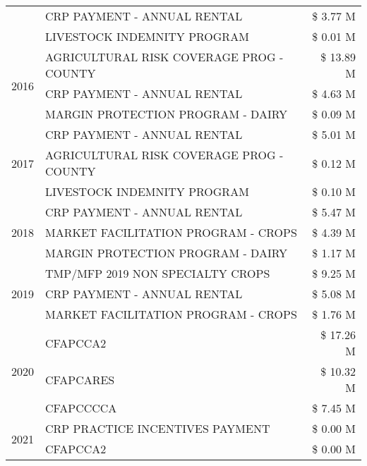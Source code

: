 \begin{tabular}{llr}
 & CRP PAYMENT - ANNUAL RENTAL & \$ 3.77 M \\
 & LIVESTOCK INDEMNITY PROGRAM & \$ 0.01 M \\
\cline{1-3}
\multirow[t]{3}{*}{2016} & AGRICULTURAL RISK COVERAGE PROG - COUNTY & \$ 13.89 M \\
 & CRP PAYMENT - ANNUAL RENTAL & \$ 4.63 M \\
 & MARGIN PROTECTION PROGRAM - DAIRY & \$ 0.09 M \\
\cline{1-3}
\multirow[t]{3}{*}{2017} & CRP PAYMENT - ANNUAL RENTAL & \$ 5.01 M \\
 & AGRICULTURAL RISK COVERAGE PROG - COUNTY & \$ 0.12 M \\
 & LIVESTOCK INDEMNITY PROGRAM & \$ 0.10 M \\
\cline{1-3}
\multirow[t]{3}{*}{2018} & CRP PAYMENT - ANNUAL RENTAL & \$ 5.47 M \\
 & MARKET FACILITATION PROGRAM - CROPS & \$ 4.39 M \\
 & MARGIN PROTECTION PROGRAM - DAIRY & \$ 1.17 M \\
\cline{1-3}
\multirow[t]{3}{*}{2019} & TMP/MFP 2019 NON SPECIALTY CROPS & \$ 9.25 M \\
 & CRP PAYMENT - ANNUAL RENTAL & \$ 5.08 M \\
 & MARKET FACILITATION PROGRAM - CROPS & \$ 1.76 M \\
\cline{1-3}
\multirow[t]{3}{*}{2020} & CFAPCCA2 & \$ 17.26 M \\
 & CFAPCARES & \$ 10.32 M \\
 & CFAPCCCCA & \$ 7.45 M \\
\cline{1-3}
\multirow[t]{2}{*}{2021} & CRP PRACTICE INCENTIVES PAYMENT & \$ 0.00 M \\
 & CFAPCCA2 & \$ 0.00 M \\
\cline{1-3}
\bottomrule
\end{tabular}
